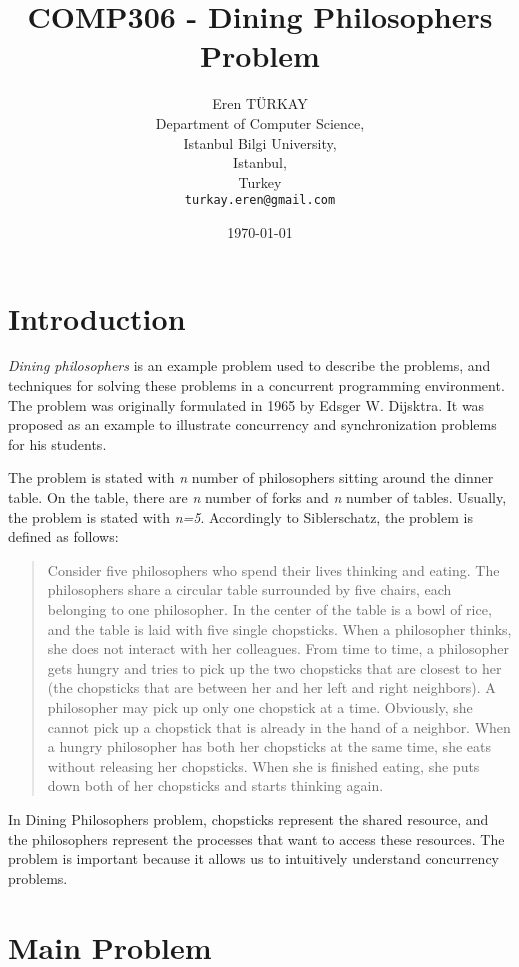 \documentclass[a4paper,12pt]{article}
\author{Eren TÜRKAY\\
    \small Department of Computer Science,\\
    \small Istanbul Bilgi University,\\
    \small Istanbul,\\
    \small Turkey\\
    \texttt{\small turkay.eren@gmail.com}}
\title{COMP306 - Dining Philosophers Problem}
\date{\today}
\begin{document}
\maketitle
\newpage

\section{Introduction} %
\label{sec:Introduction}

\emph{Dining philosophers} is an example problem used to describe the
problems, and techniques for solving these problems in a concurrent
programming environment. The problem was originally formulated in 1965
by Edsger W. Dijsktra. It was proposed as an example to
illustrate concurrency and synchronization problems for his students.

The problem is stated with \emph{n} number of philosophers sitting
around the dinner table. On the table, there are \emph{n} number of
forks and \emph{n} number of tables. Usually, the problem is stated with
\emph{n=5}. Accordingly to Siblerschatz, the problem is defined as
follows:

\begin{quote}
Consider five philosophers who spend their lives thinking and eating.
The philosophers share a circular table surrounded by five chairs, each
belonging to one philosopher. In the center of the table is a bowl of
rice, and the table is laid with five single chopsticks.  When a
philosopher thinks, she does not interact with her colleagues.  From
time to time, a philosopher gets hungry and tries to pick up the two
chopsticks that are closest to her (the chopsticks that are between her
and her left and right neighbors). A philosopher may pick up only one
chopstick at a time. Obviously, she cannot pick up a chopstick that is
already in the hand of a neighbor. When a hungry philosopher has both
her chopsticks at the same time, she eats without releasing her
chopsticks. When she is finished eating, she puts down both of her
chopsticks and starts thinking again. \cite{siblerschatz}
\end{quote}

In Dining Philosophers problem, chopsticks represent the shared
resource, and the philosophers represent the processes that want to
access these resources. The problem is important because it allows us to
intuitively understand concurrency problems.


\section{Main Problem} %
\label{sec:Main Problem}
\end{document}
